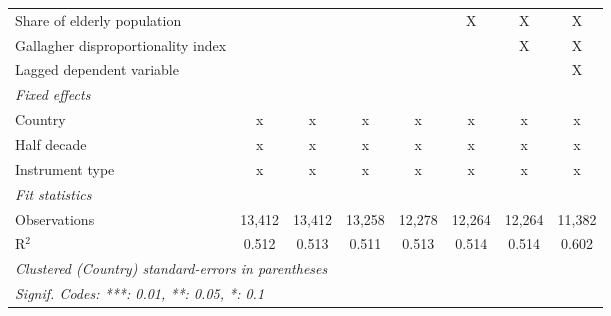\begin{tabular}{lccccccc}
   Share of elderly population                                       &                &               &              &              & X             & X             & X\\  
   Gallagher disproportionality index                                &                &               &              &              &               & X             & X\\  
   Lagged dependent variable                                         &                &               &              &              &               &               & X\\  
   \emph{Fixed effects}\\
   Country                                                           & x              & x             & x            & x            & x             & x             & x\\  
   Half decade                                                       & x              & x             & x            & x            & x             & x             & x\\  
   Instrument type                                                   & x              & x             & x            & x            & x             & x             & x\\  
   \midrule \emph{Fit statistics}\\
   Observations                                                      & 13,412         & 13,412        & 13,258       & 12,278       & 12,264        & 12,264        & 11,382\\  
   R$^2$                                                             & 0.512          & 0.513         & 0.511        & 0.513        & 0.514         & 0.514         & 0.602\\  
   \midrule
   \multicolumn{8}{l}{\emph{Clustered (Country) standard-errors in parentheses}}\\
   \multicolumn{8}{l}{\emph{Signif. Codes: ***: 0.01, **: 0.05, *: 0.1}}\\
\end{tabular}
\par\endgroup


